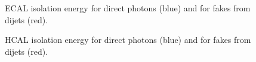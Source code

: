 \documentclass{cmspaper}
\begin{document}
\begin{figure}[hbtp]
  \begin{center}
    \caption{ECAL isolation energy for direct photons (blue) and for fakes from dijets (red).}
    \label{fig:EMiso_EMLoose}
  \end{center}
\end{figure}
\begin{figure}[hbtp]
  \begin{center}
    \caption{HCAL isolation energy for direct photons (blue) and for fakes from dijets (red).}
    \label{fig:HCALiso_EMLoose}
  \end{center}
\end{figure}
\end{document}
